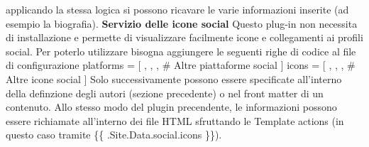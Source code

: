 \documentclass[target=bach,aauheader=]{thud}
\begin{document}
applicando la stessa logica si possono ricavare le varie informazioni inserite (ad esempio la biografia).
\newline
\newline
\textbf{{\fontsize{12}{14}\selectfont Servizio delle icone social}}
\newline \newline
Questo plug-in non necessita di installazione e permette di visualizzare facilmente icone e collegamenti ai profili social. Per poterlo utilizzare bisogna aggiungere le seguenti righe di codice al file di configurazione 
\newline \newline [social]
\newline platforms = [
,
,
,
\newline    \# Altre piattaforme social
\newline ]
\newline
\newline icons = [
,
,
,
\newline    \# Altre icone social
\newline ]
\newline \newline
Solo successivamente possono essere specificate all'interno della definzione degli autori (sezione precedente) o nel front matter di un contenuto.
Allo stesso modo del plugin precendente, le informazioni possono essere richiamate all'interno dei file HTML sfruttando le Template actions (in questo caso tramite \{\{ .Site.Data.social.icons \}\}).

\end{document}
